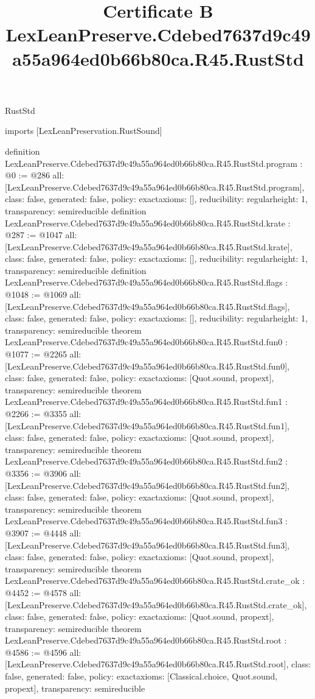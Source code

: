 \begin{lexlean}{RustStd}
\title{Certificate B LexLeanPreserve.Cdebed7637d9c49a55a964ed0b66b80ca.R45.RustStd}
\begin{coremodule}
imports [LexLeanPreservation.RustSound]

definition LexLeanPreserve.Cdebed7637d9c49a55a964ed0b66b80ca.R45.RustStd.program : @0 := @286 {
  all: [LexLeanPreserve.Cdebed7637d9c49a55a964ed0b66b80ca.R45.RustStd.program],
  class: false,
  generated: false,
  policy: exact{axioms: []},
  reducibility: regular{height: 1},
  transparency: semireducible
}
definition LexLeanPreserve.Cdebed7637d9c49a55a964ed0b66b80ca.R45.RustStd.krate : @287 := @1047 {
  all: [LexLeanPreserve.Cdebed7637d9c49a55a964ed0b66b80ca.R45.RustStd.krate],
  class: false,
  generated: false,
  policy: exact{axioms: []},
  reducibility: regular{height: 1},
  transparency: semireducible
}
definition LexLeanPreserve.Cdebed7637d9c49a55a964ed0b66b80ca.R45.RustStd.flags : @1048 := @1069 {
  all: [LexLeanPreserve.Cdebed7637d9c49a55a964ed0b66b80ca.R45.RustStd.flags],
  class: false,
  generated: false,
  policy: exact{axioms: []},
  reducibility: regular{height: 1},
  transparency: semireducible
}
theorem LexLeanPreserve.Cdebed7637d9c49a55a964ed0b66b80ca.R45.RustStd.fun0 : @1077 := @2265 {
  all: [LexLeanPreserve.Cdebed7637d9c49a55a964ed0b66b80ca.R45.RustStd.fun0],
  class: false,
  generated: false,
  policy: exact{axioms: [Quot.sound, propext]},
  transparency: semireducible
}
theorem LexLeanPreserve.Cdebed7637d9c49a55a964ed0b66b80ca.R45.RustStd.fun1 : @2266 := @3355 {
  all: [LexLeanPreserve.Cdebed7637d9c49a55a964ed0b66b80ca.R45.RustStd.fun1],
  class: false,
  generated: false,
  policy: exact{axioms: [Quot.sound, propext]},
  transparency: semireducible
}
theorem LexLeanPreserve.Cdebed7637d9c49a55a964ed0b66b80ca.R45.RustStd.fun2 : @3356 := @3906 {
  all: [LexLeanPreserve.Cdebed7637d9c49a55a964ed0b66b80ca.R45.RustStd.fun2],
  class: false,
  generated: false,
  policy: exact{axioms: [Quot.sound, propext]},
  transparency: semireducible
}
theorem LexLeanPreserve.Cdebed7637d9c49a55a964ed0b66b80ca.R45.RustStd.fun3 : @3907 := @4448 {
  all: [LexLeanPreserve.Cdebed7637d9c49a55a964ed0b66b80ca.R45.RustStd.fun3],
  class: false,
  generated: false,
  policy: exact{axioms: [Quot.sound, propext]},
  transparency: semireducible
}
theorem LexLeanPreserve.Cdebed7637d9c49a55a964ed0b66b80ca.R45.RustStd.crate_ok : @4452 := @4578 {
  all: [LexLeanPreserve.Cdebed7637d9c49a55a964ed0b66b80ca.R45.RustStd.crate_ok],
  class: false,
  generated: false,
  policy: exact{axioms: [Quot.sound, propext]},
  transparency: semireducible
}
theorem LexLeanPreserve.Cdebed7637d9c49a55a964ed0b66b80ca.R45.RustStd.root : @4586 := @4596 {
  all: [LexLeanPreserve.Cdebed7637d9c49a55a964ed0b66b80ca.R45.RustStd.root],
  class: false,
  generated: false,
  policy: exact{axioms: [Classical.choice, Quot.sound, propext]},
  transparency: semireducible
}


\end{coremodule}
\end{lexlean}
